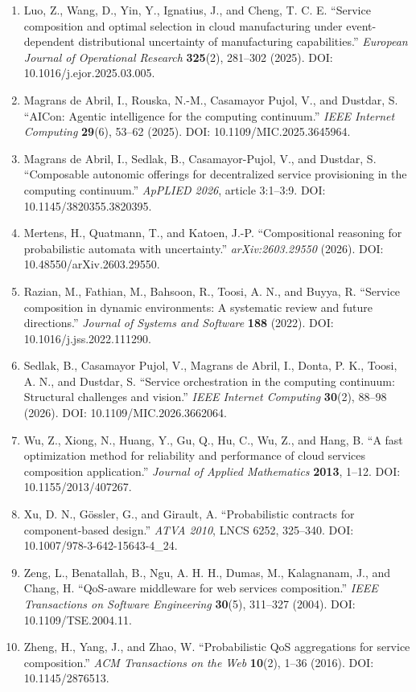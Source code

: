 \documentclass[10pt,a4paper]{article}
\begin{document}
\begin{enumerate}
\item Luo, Z., Wang, D., Yin, Y., Ignatius, J., and Cheng, T. C. E. “Service composition and optimal selection in cloud manufacturing under event-dependent distributional uncertainty of manufacturing capabilities.” \emph{European Journal of Operational Research} \textbf{325}(2), 281–302 (2025). DOI: 10.1016/j.ejor.2025.03.005.
\item Magrans de Abril, I., Rouska, N.-M., Casamayor Pujol, V., and Dustdar, S. “AICon: Agentic intelligence for the computing continuum.” \emph{IEEE Internet Computing} \textbf{29}(6), 53–62 (2025). DOI: 10.1109/MIC.2025.3645964.
\item Magrans de Abril, I., Sedlak, B., Casamayor-Pujol, V., and Dustdar, S. “Composable autonomic offerings for decentralized service provisioning in the computing continuum.” \emph{ApPLIED 2026}, article 3:1–3:9. DOI: 10.1145/3820355.3820395.
\item Mertens, H., Quatmann, T., and Katoen, J.-P. “Compositional reasoning for probabilistic automata with uncertainty.” \emph{arXiv:2603.29550} (2026). DOI: 10.48550/arXiv.2603.29550.
\item Razian, M., Fathian, M., Bahsoon, R., Toosi, A. N., and Buyya, R. “Service composition in dynamic environments: A systematic review and future directions.” \emph{Journal of Systems and Software} \textbf{188} (2022). DOI: 10.1016/j.jss.2022.111290.
\item Sedlak, B., Casamayor Pujol, V., Magrans de Abril, I., Donta, P. K., Toosi, A. N., and Dustdar, S. “Service orchestration in the computing continuum: Structural challenges and vision.” \emph{IEEE Internet Computing} \textbf{30}(2), 88–98 (2026). DOI: 10.1109/MIC.2026.3662064.
\item Wu, Z., Xiong, N., Huang, Y., Gu, Q., Hu, C., Wu, Z., and Hang, B. “A fast optimization method for reliability and performance of cloud services composition application.” \emph{Journal of Applied Mathematics} \textbf{2013}, 1–12. DOI: 10.1155/2013/407267.
\item Xu, D. N., Gössler, G., and Girault, A. “Probabilistic contracts for component-based design.” \emph{ATVA 2010}, LNCS 6252, 325–340. DOI: 10.1007/978-3-642-15643-4\_24.
\item Zeng, L., Benatallah, B., Ngu, A. H. H., Dumas, M., Kalagnanam, J., and Chang, H. “QoS-aware middleware for web services composition.” \emph{IEEE Transactions on Software Engineering} \textbf{30}(5), 311–327 (2004). DOI: 10.1109/TSE.2004.11.
\item Zheng, H., Yang, J., and Zhao, W. “Probabilistic QoS aggregations for service composition.” \emph{ACM Transactions on the Web} \textbf{10}(2), 1–36 (2016). DOI: 10.1145/2876513.

\end{enumerate}
\end{document}
